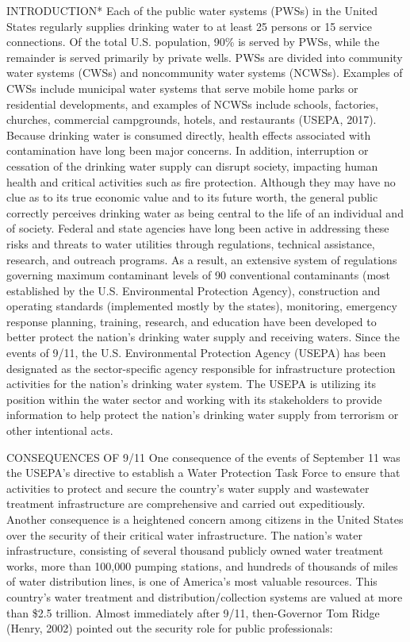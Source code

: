 \documentclass{article}
\begin{document}
INTRODUCTION* Each of the public water systems (PWSs) in the United
States regularly supplies drinking water to at least 25 persons or 15
service connections. Of the total U.S. population, 90\% is served by
PWSs, while the remainder is served primarily by private wells. PWSs are
divided into community water systems (CWSs) and noncommunity water
systems (NCWSs). Examples of CWSs include municipal water systems that
serve mobile home parks or residential developments, and examples of
NCWSs include schools, factories, churches, commercial campgrounds,
hotels, and restaurants (USEPA, 2017). Because drinking water is
consumed directly, health effects associated with contamination have
long been major concerns. In addition, interruption or cessation of the
drinking water supply can disrupt society, impacting human health and
critical activities such as fire protection. Although they may have no
clue as to its true economic value and to its future worth, the general
public correctly perceives drinking water as being central to the life
of an individual and of society. Federal and state agencies have long
been active in addressing these risks and threats to water utilities
through regulations, technical assistance, research, and outreach
programs. As a result, an extensive system of regulations governing
maximum contaminant levels of 90 conventional contaminants (most
established by the U.S. Environmental Protection Agency), construction
and operating standards (implemented mostly by the states), monitoring,
emergency response planning, training, research, and education have been
developed to better protect the nation's drinking water supply and
receiving waters. Since the events of 9/11, the U.S. Environmental
Protection Agency (USEPA) has been designated as the sector-specific
agency responsible for infrastructure protection activities for the
nation's drinking water system. The USEPA is utilizing its position
within the water sector and working with its stakeholders to provide
information to help protect the nation's drinking water supply from
terrorism or other intentional acts.

CONSEQUENCES OF 9/11 One consequence of the events of September 11 was
the USEPA's directive to establish a Water Protection Task Force to
ensure that activities to protect and secure the country's water supply
and wastewater treatment infrastructure are comprehensive and carried
out expeditiously. Another consequence is a heightened concern among
citizens in the United States over the security of their critical water
infrastructure. The nation's water infrastructure, consisting of several
thousand publicly owned water treatment works, more than 100,000 pumping
stations, and hundreds of thousands of miles of water distribution
lines, is one of America's most valuable resources. This country's water
treatment and distribution/collection systems are valued at more than
\$2.5 trillion. Almost immediately after 9/11, then-Governor Tom Ridge
(Henry, 2002) pointed out the security role for public professionals:
\end{document}
